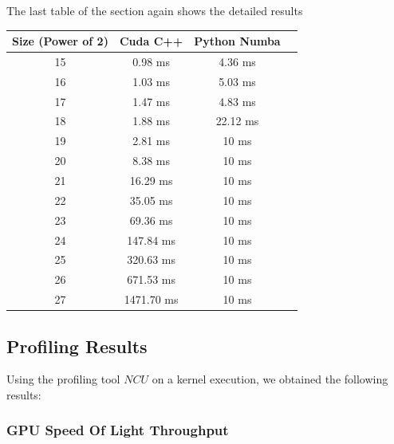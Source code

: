 \documentclass[a4paper, 12pt, oneside]{article}
\begin{document}
The last table of the section again shows the detailed results

\begin{center}
  \begin{tabular}{ |c|c|c|c| }
    \hline
    \textbf{Size (Power of 2)} & \textbf{Cuda C++} & \textbf{Python Numba} \\
    \hline
    15                         & 0.98 ms           & 4.36 ms               \\
    16                         & 1.03 ms           & 5.03 ms               \\
    17                         & 1.47 ms           & 4.83 ms               \\
    18                         & 1.88 ms           & 22.12 ms              \\
    19                         & 2.81 ms           & 10 ms                 \\
    20                         & 8.38 ms           & 10 ms                 \\
    21                         & 16.29 ms          & 10 ms                 \\
    22                         & 35.05 ms          & 10 ms                 \\
    23                         & 69.36 ms          & 10 ms                 \\
    24                         & 147.84 ms         & 10 ms                 \\
    25                         & 320.63 ms         & 10 ms                 \\
    26                         & 671.53 ms         & 10 ms                 \\
    27                         & 1471.70 ms        & 10 ms                 \\
    \hline
  \end{tabular}
\end{center}

\subsection{Profiling Results}

Using the profiling tool $NCU$ on a kernel execution, we obtained the following results:\\

\subsubsection{GPU Speed Of Light Throughput}
\end{document}
